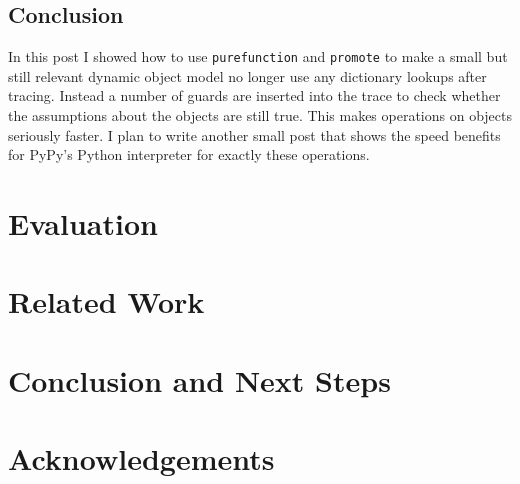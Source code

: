 \documentclass{sig-alternate}
\begin{document}

\subsection{Conclusion}

In this post I showed how to use \texttt{purefunction} and \texttt{promote} to make a
small but still relevant dynamic object model no longer use any dictionary lookups
after tracing. Instead a number of guards are inserted into the
trace to check whether the assumptions about the objects are still true. This
makes operations on objects seriously faster. I plan to write another small post
that shows the speed benefits for PyPy's Python interpreter for exactly these
operations.

\section{Evaluation}
\label{sect:evaluation}

\section{Related Work}

\section{Conclusion and Next Steps}

\section*{Acknowledgements}



\end{document}
